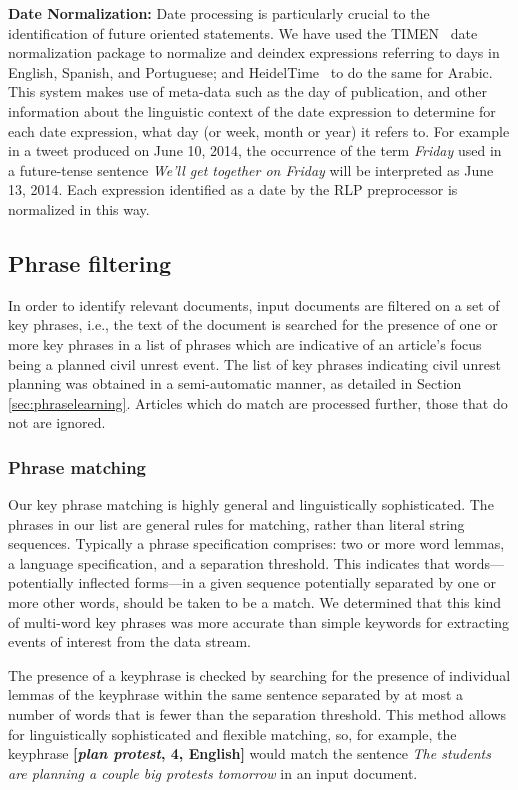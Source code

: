 \noindent
{\bf Date Normalization:} Date processing is particularly crucial to the identification of
future oriented statements. {\color{red} We have used the TIMEN~\cite{LlorensDGS12} date
normalization package to normalize and deindex expressions referring
to days in English, Spanish, and Portuguese; and
HeidelTime~\cite{strotgen2014time} to do the same for Arabic.} This system makes use of
meta-data such as the day of publication, and other information about
the linguistic context of the date expression to determine for each
date expression, what day (or week, month or year) it refers to. For
example in a tweet produced on June 10, 2014, the occurrence of the
term {\em Friday} used in a future-tense sentence {\em We'll get
  together on Friday} will be interpreted as June 13, 2014.  Each
expression identified as a date by the RLP preprocessor is normalized
in this way.

\subsection{Phrase filtering}
In order to identify relevant documents, input documents are filtered on a set of key phrases, i.e.,
the text of the document is searched for the presence of one or
more key phrases in a list of phrases which are indicative of an article's focus being
a planned civil unrest event.  
The list of key phrases indicating civil unrest planning was obtained
in a semi-automatic manner, as detailed in Section \ref{sec:phraselearning}.
Articles which do match are processed further, those that do not are ignored.

\subsubsection{Phrase matching}
Our key phrase matching is highly general and linguistically
sophisticated.  The phrases in our list are general rules for
matching, rather than literal string sequences. Typically a phrase
specification comprises: two or more word lemmas, a language
specification, and a separation threshold. This indicates that words---potentially inflected forms---in 
a given sequence potentially separated by one or more other words, should be taken to be a
match. We determined that this kind of
multi-word key phrases was more accurate than simple keywords for
extracting events of interest from the data stream.

The presence of a keyphrase is checked by searching for the presence of
individual lemmas of the keyphrase within the same sentence separated
by at most a number of words that is fewer than the separation threshold.  
This method allows for linguistically sophisticated and flexible matching, so, for example,
the keyphrase {\bf [{\em plan protest}, 4, English]} would match the sentence
{\em The students are planning a couple big protests tomorrow} in an input document.

